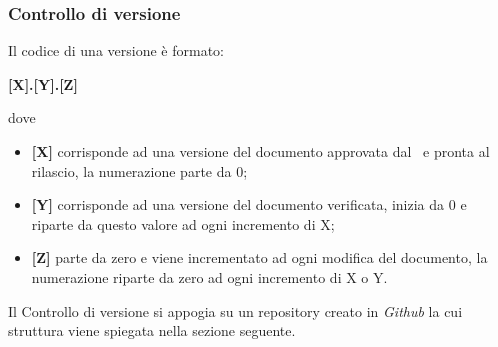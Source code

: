 \subsubsection{Controllo di versione}\label{Versionamento}
Il codice di una versione è formato: 
\begin{center}
	\textbf{[X].[Y].[Z]}
\end{center}
dove 
\begin{itemize}
	\item \textbf{[X]} corrisponde ad una versione del documento approvata dal \Responsabile\ e pronta al rilascio, la numerazione parte da 0;
	\item \textbf{[Y]} corrisponde ad una versione del documento verificata, inizia da 0 e riparte da questo valore ad ogni incremento di X;
	\item \textbf{[Z]} parte da zero e viene incrementato ad ogni modifica del documento, la numerazione riparte da zero ad ogni incremento di X o Y.
\end{itemize}
Il Controllo di versione si appogia su un repository creato in \textit{Github} la cui struttura viene spiegata nella sezione seguente.


